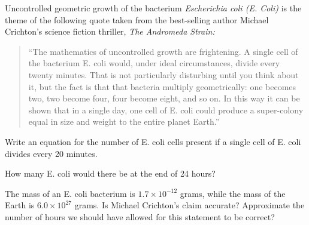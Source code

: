 \begin{activity}\label{A:0.2.3}\cite[p.9]{nonlinear}
    Uncontrolled geometric growth of the bacterium {\it Escherichia coli (E. Coli)} is the
    theme of the following quote taken from the best-selling author Michael Crichton's
    science fiction thriller, {\it The Andromeda Strain:}
    \begin{quote}
        ``The mathematics of uncontrolled growth are frightening.  A single cell of the
        bacterium E. coli would, under ideal circumstances, divide every twenty minutes.
        That is not particularly disturbing until you think about it, but the fact is that
        that bacteria multiply geometrically: one becomes two, two become four, four
        become eight, and so on.  In this way it can be shown that in a single day, one
        cell of E. coli could produce a super-colony equal in size and weight to the
        entire planet Earth.''
    \end{quote}
    \ba
        \item Write an equation for the number of E. coli cells present if a single cell
            of E. coli divides every 20 minutes. 
        \item How many E. coli would there be at the end of 24 hours?
        \item The mass of an E. coli bacterium is $1.7 \times 10^{-12}$ grams, while the
            mass of the Earth is $6.0 \times 10^{27}$ grams.  Is Michael Crichton's claim
            accurate?  Approximate the number of hours we should have allowed for this
            statement to be correct?
    \ea
\end{activity}\aftera
